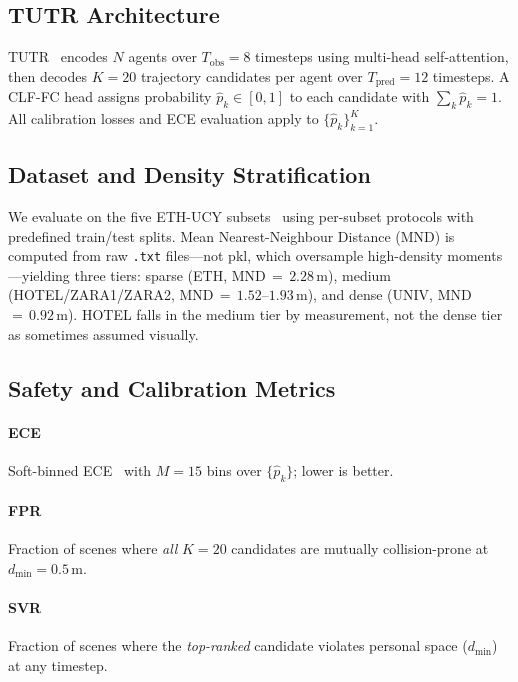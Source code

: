 \documentclass[journal]{IEEEtran}
\begin{document}
\subsection{TUTR Architecture}

TUTR~\cite{shi2023tutr} encodes $N$ agents over $T_\text{obs}{=}8$
timesteps using multi-head self-attention, then decodes $K{=}20$
trajectory candidates per agent over $T_\text{pred}{=}12$ timesteps.
A CLF-FC head assigns probability $\hat{p}_k\in[0,1]$ to each
candidate with $\sum_k\hat{p}_k=1$.
All calibration losses and ECE evaluation apply to
$\{\hat{p}_k\}_{k=1}^K$.

\subsection{Dataset and Density Stratification}

We evaluate on the five ETH-UCY
subsets~\cite{pellegrini2009eth,lerner2007ucy} using per-subset
protocols with predefined train/test splits.
Mean Nearest-Neighbour Distance (MND) is computed from raw
\texttt{.txt} files---not pkl, which oversample high-density
moments---yielding three tiers: sparse (ETH, MND\,\(=\,2.28\)\,m),
medium (HOTEL/ZARA1/ZARA2, MND\,\(=\,1.52\)--\(1.93\)\,m), and
dense (UNIV, MND\,\(=\,0.92\)\,m).
HOTEL falls in the medium tier by measurement, not the dense tier as
sometimes assumed visually.

\subsection{Safety and Calibration Metrics}

\paragraph{ECE} Soft-binned ECE~\cite{karandikar2021soft} with
$M{=}15$ bins over $\{\hat{p}_k\}$; lower is better.

\paragraph{FPR} Fraction of scenes where \emph{all} $K{=}20$
candidates are mutually collision-prone at $d_\text{min}{=}0.5$\,m.

\paragraph{SVR} Fraction of scenes where the \emph{top-ranked}
candidate violates personal space ($d_\text{min}$) at any timestep.
\end{document}

